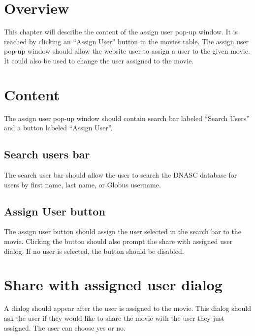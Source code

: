 
\section{Overview}

This chapter will describe the content of the assign user pop-up window.
It is reached by clicking an ``Assign User'' button in the movies table.
The assign user pop-up window should allow the website user to assign a
user to the given movie. It could also be used to change the user assigned
to the movie.

\section{Content}

The assign user pop-up window should contain search bar labeled ``Search Users''
and a button labeled ``Assign User''.

\subsection{Search users bar}

The search user bar should allow the user to search the DNASC database for users by first 
name, last name, or Globus username.

\subsection{Assign User button}

The assign user button should assign the user selected in the search bar to the movie.
Clicking the button should also prompt the share with assigned user dialog. If no user 
is selected, the button should be disabled.

\section{Share with assigned user dialog}

A dialog should appear after the user is assigned to the movie. This dialog should
ask the user if they would like to share the movie with the user they just assigned.
The user can choose yes or no. 